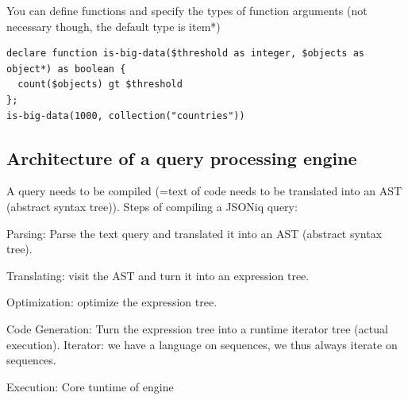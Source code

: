 \documentclass[11pt,oneside,a4paper]{article}
\begin{document}
{You can define functions and specify the types of function arguments (not necessary though, the default type is item*)
\begin{lstlisting}[basicstyle=\small]
declare function is-big-data($threshold as integer, $objects as object*) as boolean {
  count($objects) gt $threshold
};
is-big-data(1000, collection("countries"))
\end{lstlisting}

\subsection{Architecture of a query processing engine}

A query needs to be compiled (=text of code needs to be translated into an AST (abstract syntax tree)). Steps of compiling a JSONiq query:

\begin{compactenum}
\item Parsing: Parse the text query and translated it into an AST (abstract syntax tree).
\item Translating: visit the AST and turn it into an expression tree.
\item Optimization: optimize the expression tree.
\item Code Generation: Turn the expression tree into a runtime iterator tree (actual execution). Iterator: we have a language on sequences, we thus always iterate on sequences.
\item Execution: Core tuntime of engine
\end{compactenum}

}
\end{document}
